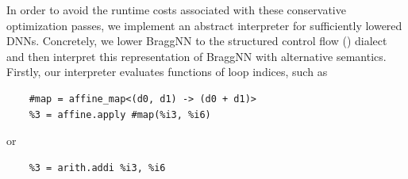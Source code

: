 In order to avoid the runtime costs associated with these conservative optimization passes, we implement an abstract interpreter for sufficiently lowered DNNs.
Concretely, we lower BraggNN to the structured control flow () dialect and then interpret this representation of BraggNN with alternative semantics.
Firstly, our interpreter evaluates functions of loop indices, such as 
\begin{verbatim}
	#map = affine_map<(d0, d1) -> (d0 + d1)>
	%3 = affine.apply #map(%i3, %i6)
\end{verbatim}
or 
\begin{verbatim}
	%3 = arith.addi %i3, %i6
\end{verbatim}
